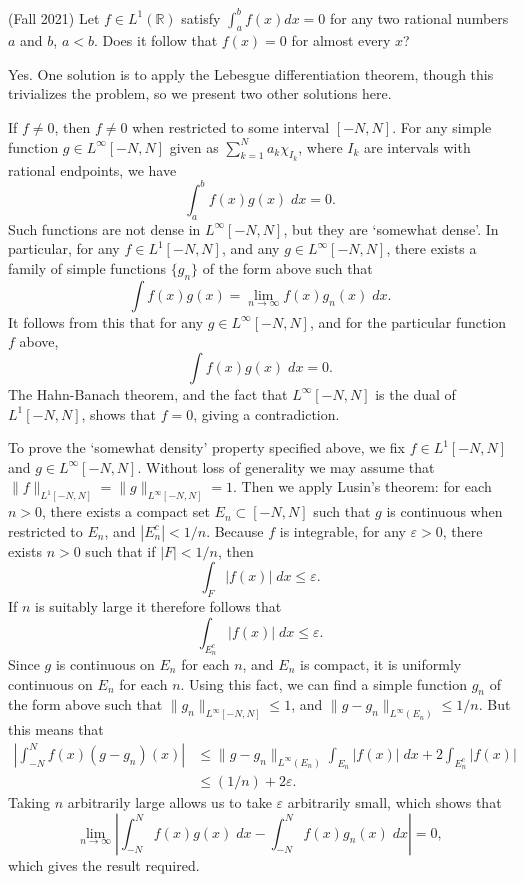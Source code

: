 \documentclass{exam}
\theoremstyle{problemstyle}
\newcommand{\1}[1]{\textbf{1}_{\left[#1\right]}} %
\begin{document}
\begin{questions}
\question (Fall 2021) Let $f\in L^1(\mathbb{R})$  satisfy $\int_{a}^{b}f(x)dx=0$
for any two rational numbers $a$ and $b$, $a<b$. Does it follow that $f(x)=0$
for almost every $x$?

\begin{solution}
	Yes. One solution is to apply the Lebesgue differentiation theorem, though this trivializes the problem, so we present two other solutions here.

	If $f \neq 0$, then $f \neq 0$ when restricted to some interval $[-N,N]$. For any simple function $g \in L^\infty[-N,N]$ given as $\sum_{k = 1}^N a_k \chi_{I_k}$, where $I_k$ are intervals with rational endpoints, we have
	\[ \int_a^b f(x) g(x)\; dx = 0. \]
	Such functions are not dense in $L^\infty[-N,N]$, but they are `somewhat dense'. In particular, for any $f \in L^1[-N,N]$, and any $g \in L^\infty[-N,N]$, there exists a family of simple functions $\{ g_n \}$ of the form above such that
	\[ \int f(x) g(x) = \lim_{n \to \infty} f(x) g_n(x)\; dx. \]
	It follows from this that for any $g \in L^\infty[-N,N]$, and for the particular function $f$ above,
	\[ \int f(x) g(x)\; dx = 0. \]
	The Hahn-Banach theorem, and the fact that $L^\infty[-N,N]$ is the dual of $L^1[-N,N]$, shows that $f = 0$, giving a contradiction.

	To prove the `somewhat density' property specified above, we fix $f \in L^1[-N,N]$ and $g \in L^\infty[-N,N]$. Without loss of generality we may assume that $\| f \|_{L^1[-N,N]} = \| g \|_{L^\infty[-N,N]} = 1$. Then we apply Lusin's theorem: for each $n > 0$, there exists a compact set $E_n \subset [-N,N]$ such that $g$ is continuous when restricted to $E_n$, and $|E_n^c| < 1/n$. Because $f$ is integrable, for any $\varepsilon > 0$, there exists $n > 0$ such that if $|F| < 1/n$, then
	\[ \int_{F} |f(x)|\; dx \leq \varepsilon. \]
	If $n$ is suitably large it therefore follows that
	\[ \int_{E_n^c} |f(x)|\; dx \leq \varepsilon. \]
	Since $g$ is continuous on $E_n$ for each $n$, and $E_n$ is compact, it is uniformly continuous on $E_n$ for each $n$. Using this fact, we can find a simple function $g_n$ of the form above such that $\| g_n \|_{L^\infty[-N,N]} \leq 1$, and $\| g - g_n \|_{L^\infty(E_n)} \leq 1/n$. But this means that 
	\begin{align*}
		\left| \int_{-N}^N f(x) (g - g_n)(x) \right| &\leq \| g - g_n \|_{L^\infty(E_n)} \int_{E_n} |f(x)|\; dx + 2 \int_{E_n^c} |f(x)|\\
		&\leq (1/n) + 2 \varepsilon.
	\end{align*}
	Taking $n$ arbitrarily large allows us to take $\varepsilon$ arbitrarily small, which shows that
	\[ \lim_{n \to \infty} \left| \int_{-N}^N f(x) g(x)\; dx - \int_{-N}^N f(x) g_n(x)\; dx \right| = 0, \]
	which gives the result required.


\end{solution}
\end{questions}
\end{document}
